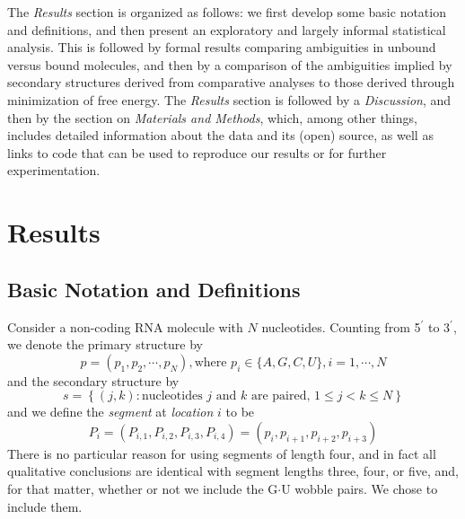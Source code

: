 \documentclass[10pt,letterpaper]{article}
\begin{document}
The {\em Results} section is organized as follows:  we first develop some basic notation and definitions, and then present an exploratory and largely informal statistical analysis. This is followed by formal results comparing ambiguities in unbound versus bound molecules, and then by a comparison of the ambiguities implied by secondary structures derived from comparative analyses to those derived through minimization of free energy. 
The {\em Results} section is followed by a {\em Discussion}, and then by the section on {\em Materials and Methods}, which, among other things, includes detailed information about the data and its (open) source, as well as links to code that can be used to reproduce our results or for further experimentation. 

\section*{Results}

\subsection*{Basic Notation and Definitions}

Consider a non-coding RNA molecule with $N$ nucleotides.  Counting from 5$^\prime$ to 3$^\prime$, we denote the primary structure by
\begin{equation}
p = (p_1, p_2, \cdots, p_N)  , \text{where }p_i \in \{ A, G, C, U \}, i = 1, \cdots, N
\end{equation}
and the secondary structure by
\begin{equation}
s = \left\{ (j, k) :\text{nucleotides $j$ and $k$ are paired, $1 \leq j < k \leq N$} \right\}
\end{equation}
and we define the {\em segment} at {\em location} $i$ to be 
\begin{equation}
	P_i = (P_{i, 1}, P_{i, 2},P_{i, 3}, P_{i, 4}) = (p_i, p_{i + 1},p_{i + 2},p_{i + 3})
\end{equation}
There is no particular reason for using segments of length four, and in fact all qualitative conclusions are identical with segment lengths three, four, or five, 
and, for that matter, whether or not we include the G$\cdot$U wobble pairs. 
We chose to include them.
\end{document}
